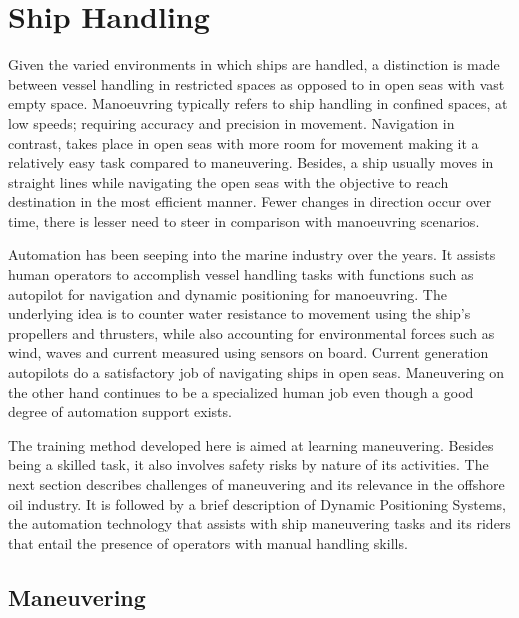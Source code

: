 \section{Ship Handling}

Given the varied environments in which ships are handled, a distinction is made between vessel handling in restricted spaces as opposed to in open seas with vast empty space. Manoeuvring typically refers to ship handling in confined spaces, at low speeds; requiring accuracy and precision in movement. Navigation in contrast, takes place in open seas with more room for movement making it a relatively easy task compared to maneuvering. Besides, a ship usually moves in straight lines while navigating the open seas with the objective to reach destination in the most efficient manner. Fewer changes in direction occur over time, there is lesser need to steer in comparison with manoeuvring scenarios. 

Automation has been seeping into the marine industry over the years. It assists human operators to accomplish vessel handling tasks with functions such as autopilot for navigation and dynamic positioning for manoeuvring. The underlying idea is to counter water resistance to movement using the ship's propellers and thrusters, while also accounting for environmental forces such as wind, waves and current measured using sensors on board. Current generation autopilots do a satisfactory job of navigating ships in open seas. Maneuvering on the other hand continues to be a specialized human job even though a good degree of automation support exists.


The training method developed here is aimed at learning maneuvering. Besides being a skilled task, it also involves safety risks by nature of its activities. The next section describes challenges of maneuvering and its relevance in the offshore oil industry. It is followed by a brief description of Dynamic Positioning Systems, the automation technology that assists with ship maneuvering tasks and its riders that entail the presence of operators with manual handling skills. 

\subsection{Maneuvering}


